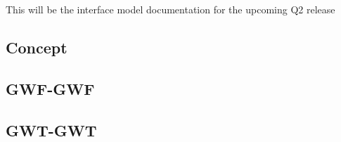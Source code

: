 This will be the interface model documentation for the upcoming Q2 release

\subsection{Concept}

\subsection{GWF-GWF}

\subsection{GWT-GWT}